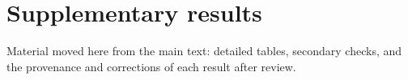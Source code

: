 \documentclass[11pt,letterpaper]{article}
\theoremstyle{plain}
\theoremstyle{definition}
\theoremstyle{remark}
\begin{document}










\appendix




\section{Supplementary results}\label{app:supp}
Material moved here from the main text: detailed tables, secondary checks, and the provenance and corrections
of each result after review.
\end{document}
